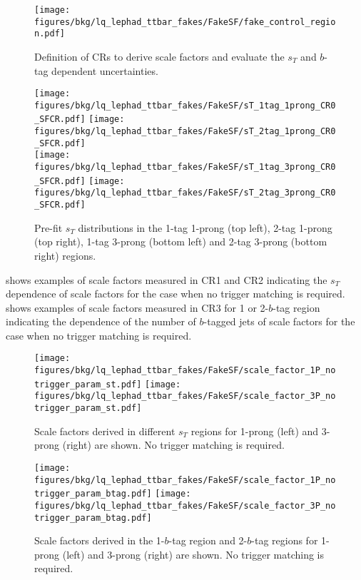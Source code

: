 \begin{figure}
    \centering
    \texttt{[image: figures/bkg/lq\_lephad\_ttbar\_fakes/FakeSF/fake\_control\_region.pdf]}
  \caption{Definition of CRs to derive scale factors and evaluate the $s_T$ and $b$-tag dependent uncertainties.}
  \label{fig:lq_ttbarfake_CRs}
\end{figure}

\begin{figure}
    \centering
    \texttt{[image: figures/bkg/lq\_lephad\_ttbar\_fakes/FakeSF/sT\_1tag\_1prong\_CR0\_SFCR.pdf]}
    \texttt{[image: figures/bkg/lq\_lephad\_ttbar\_fakes/FakeSF/sT\_2tag\_1prong\_CR0\_SFCR.pdf]} \\
    \texttt{[image: figures/bkg/lq\_lephad\_ttbar\_fakes/FakeSF/sT\_1tag\_3prong\_CR0\_SFCR.pdf]}
    \texttt{[image: figures/bkg/lq\_lephad\_ttbar\_fakes/FakeSF/sT\_2tag\_3prong\_CR0\_SFCR.pdf]} \\
  \caption{Pre-fit $s_T$ distributions in the 1-tag 1-prong (top left), 2-tag 1-prong (top right), 1-tag 3-prong (bottom left) 
  and 2-tag 3-prong (bottom right) regions.}
  \label{fig:lq_ttbarfake_12tag_st}
\end{figure}

 shows examples of scale factors measured in CR1 and CR2 indicating the
$s_T$ dependence of scale factors for the case when no trigger matching is required.  
shows examples of scale factors measured in CR3 for 1 or 2-$b$-tag region indicating the dependence of the number of $b$-tagged jets 
of scale factors for the case when no trigger matching is required.

\begin{figure}
    \centering
    \texttt{[image: figures/bkg/lq\_lephad\_ttbar\_fakes/FakeSF/scale\_factor\_1P\_notrigger\_param\_st.pdf]}
    \texttt{[image: figures/bkg/lq\_lephad\_ttbar\_fakes/FakeSF/scale\_factor\_3P\_notrigger\_param\_st.pdf]}
  \caption{Scale factors derived in different $s_T$ regions for 1-prong (left) and 3-prong (right) are shown. No trigger matching is required.}
  \label{fig:lq_ttbarfake_SF_sT_dependence}
\end{figure}

\begin{figure}
    \centering
    \texttt{[image: figures/bkg/lq\_lephad\_ttbar\_fakes/FakeSF/scale\_factor\_1P\_notrigger\_param\_btag.pdf]}
    \texttt{[image: figures/bkg/lq\_lephad\_ttbar\_fakes/FakeSF/scale\_factor\_3P\_notrigger\_param\_btag.pdf]}
  \caption{Scale factors derived in the 1-$b$-tag region and 2-$b$-tag regions for 1-prong (left) and 3-prong (right) are shown. No trigger matching is required.}
  \label{fig:lq_ttbarfake_SF_ntag_dependence}
\end{figure}

